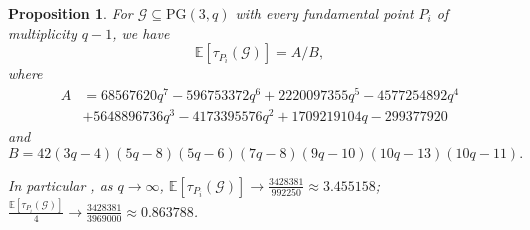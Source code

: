 \documentclass{article}
\newtheorem{proposition}{Proposition}
\newcommand{\PG}{\mathrm{PG}}
\newcommand{\Gscr}{\mathscr{G}}
\newcommand{\E}{\mathbb{E}}
\begin{document}
\begin{proposition}\label{lem:full}
For $\Gscr\subseteq\PG(3,q)$ with every fundamental
point $P_i$ of multiplicity $q-1$, we have
\[
\E[\tau_{P_i}(\Gscr)]
=A/B,\] where \begin{align*}A&=68567620q^{7}-596753372q^{6}+2220097355q^{5}-4577254892q^{4}\\&
+5648896736q^{3}-4173395576q^{2}+1709219104q-299377920\end{align*} and \[B=
{42(3q-4)(5q-8)(5q-6)(7q-8)(9q-10)(10q-13)(10q-11)}.\]

In particular%
, as $q\to \infty$, $\E[\tau_{P_i}(\Gscr)]\to \frac{3428381}{992250}\approx 3.455158$;
$\frac{\E[\tau_{P_i}(\Gscr)]}{4}\to \frac{3428381}{3969000}\approx0.863788
$.
\end{proposition}
\end{document}
